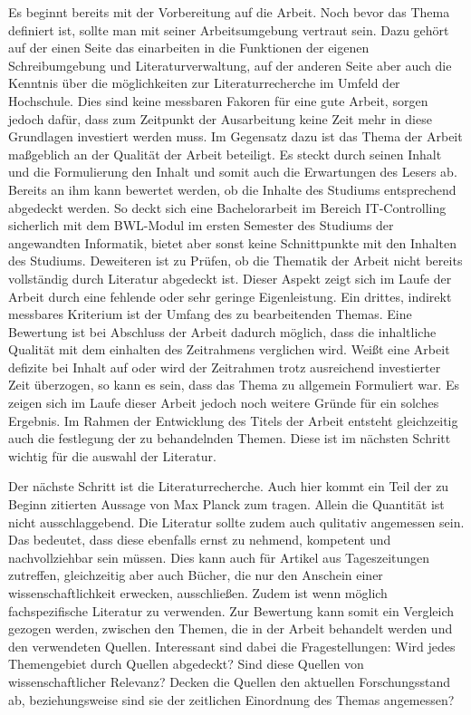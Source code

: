 Es beginnt bereits mit der Vorbereitung auf die Arbeit. Noch bevor das Thema definiert ist, sollte man mit seiner Arbeitsumgebung vertraut sein. Dazu gehört auf der einen Seite das einarbeiten in die Funktionen der eigenen Schreibumgebung und Literaturverwaltung, auf der anderen Seite aber auch die Kenntnis über die möglichkeiten zur Literaturrecherche im Umfeld der Hochschule.\cite[Vgl.][S. 43]{Baensch:2013} Dies sind keine messbaren Fakoren für eine gute Arbeit, sorgen jedoch dafür, dass zum Zeitpunkt der Ausarbeitung keine Zeit mehr in diese Grundlagen investiert werden muss.
Im Gegensatz dazu ist das Thema der Arbeit maßgeblich an der Qualität der Arbeit beteiligt. Es steckt durch seinen Inhalt und die Formulierung den Inhalt und somit auch die Erwartungen des Lesers ab. Bereits an ihm kann bewertet werden, ob die Inhalte des Studiums entsprechend abgedeckt werden. So deckt sich eine Bachelorarbeit im Bereich IT-Controlling sicherlich mit dem BWL-Modul im ersten Semester des Studiums der angewandten Informatik, bietet aber sonst keine Schnittpunkte mit den Inhalten des Studiums. Deweiteren ist zu Prüfen, ob die Thematik der Arbeit nicht bereits vollständig durch Literatur abgedeckt ist. Dieser Aspekt zeigt sich im Laufe der Arbeit durch eine fehlende oder sehr geringe Eigenleistung. Ein drittes, indirekt messbares Kriterium ist der Umfang des zu bearbeitenden Themas. Eine Bewertung ist bei Abschluss der Arbeit dadurch möglich, dass die inhaltliche Qualität mit dem einhalten des Zeitrahmens verglichen wird. Weißt eine Arbeit defizite bei Inhalt auf oder wird der Zeitrahmen trotz ausreichend investierter Zeit überzogen, so kann es sein, dass das Thema zu allgemein Formuliert war.\cite[Vgl.][S. 46 f.]{Baensch:2013} Es zeigen sich im Laufe dieser Arbeit jedoch noch weitere Gründe für ein solches Ergebnis.
Im Rahmen der Entwicklung des Titels der Arbeit entsteht gleichzeitig auch die festlegung der zu behandelnden Themen. Diese ist im nächsten Schritt wichtig für die auswahl der Literatur.

Der nächste Schritt ist die Literaturrecherche. Auch hier kommt ein Teil der zu Beginn zitierten Aussage von Max Planck zum tragen. Allein die Quantität ist nicht ausschlaggebend. Die Literatur sollte zudem auch qulitativ angemessen sein. Das bedeutet, dass diese ebenfalls ernst zu nehmend, kompetent und nachvollziehbar sein müssen. Dies kann auch für Artikel aus Tageszeitungen zutreffen, gleichzeitig aber auch Bücher, die nur den Anschein einer wissenschaftlichkeit erwecken, ausschließen. Zudem ist wenn möglich fachspezifische Literatur zu verwenden.\cite[Vgl.][S. 7 f.]{Baensch:2013} Zur Bewertung kann somit ein Vergleich gezogen werden, zwischen den Themen, die in der Arbeit behandelt werden und den verwendeten Quellen. Interessant sind dabei die Fragestellungen: Wird jedes Themengebiet durch Quellen abgedeckt? Sind diese Quellen von wissenschaftlicher Relevanz? Decken die Quellen den aktuellen Forschungsstand ab, beziehungsweise sind sie der zeitlichen Einordnung des Themas angemessen?

